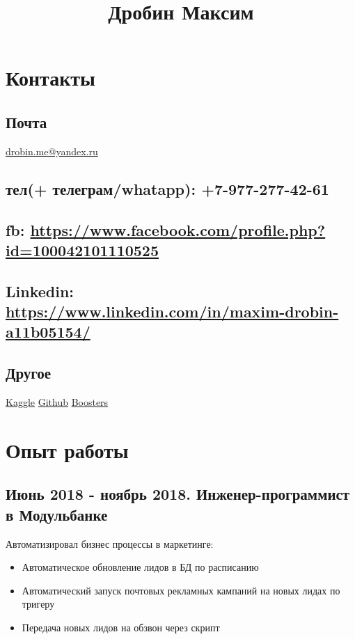\documentclass[11pt]{article}
\date{}
\title{Дробин Максим}
\begin{document}
\maketitle
\section{Контакты}
\label{sec:org6c353f2}
\subsection{Почта}
\label{sec:org008dc68}
\href{mailto:drobin.me@yandex.ru}{drobin.me@yandex.ru}

\subsection{тел(+ телеграм/whatapp): +7-977-277-42-61}
\label{sec:orgae73cb7}
\subsection{fb: \url{https://www.facebook.com/profile.php?id=100042101110525}}
\label{sec:org89aa002}
\subsection{Linkedin: \url{https://www.linkedin.com/in/maxim-drobin-a11b05154/}}
\label{sec:orgb978247}
\subsection{Другое}
\label{sec:org33ef2db}
\href{https://www.kaggle.com/malahai}{Kaggle}
\href{https://github.com/gazon1/}{Github}
\href{https://boosters.pro/user/Malahai}{Boosters}
\section{Опыт работы}
\label{sec:org33edd8d}
\subsection{Июнь 2018 - ноябрь 2018. Инженер-программист в Модульбанке}
\label{sec:orgccfc283}
Автоматизировал бизнес процессы в маркетинге: 
\begin{itemize}
\item Автоматическое обновление лидов в БД по расписанию
\item Автоматический запуск почтовых рекламных кампаний на новых лидах по тригеру
\item Передача новых лидов на обзвон через скрипт
\end{itemize}
\end{document}
